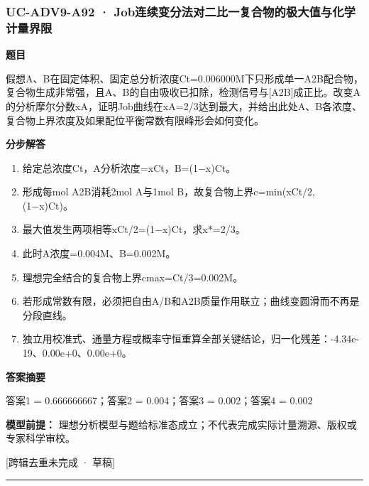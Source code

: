 \documentclass[UTF8,11pt,a4paper]{ctexart}
\begin{document}
\subsubsection*{UC-ADV9-A92 · Job连续变分法对二比一复合物的极大值与化学计量界限}
\noindent\textbf{题目}\par
假想A、B在固定体积、固定总分析浓度Ct=0.006000M下只形成单一A2B配合物，复合物生成非常强，且A、B的自由吸收已扣除，检测信号与[A2B]成正比。改变A的分析摩尔分数xA，证明Job曲线在xA=2/3达到最大，并给出此处A、B各浓度、复合物上界浓度及如果配位平衡常数有限峰形会如何变化。\par
\medskip\noindent\textbf{分步解答}
\begin{enumerate}
\item 给定总浓度Ct，A分析浓度=xCt，B=(1−x)Ct。
\item 形成每mol A2B消耗2mol A与1mol B，故复合物上界c=min(xCt/2,(1−x)Ct)。
\item 最大值发生两项相等xCt/2=(1−x)Ct，求x*=2/3。
\item 此时A浓度=0.004M、B=0.002M。
\item 理想完全结合的复合物上界cmax=Ct/3=0.002M。
\item 若形成常数有限，必须把自由A/B和A2B质量作用联立；曲线变圆滑而不再是分段直线。
\item 独立用校准式、通量方程或概率守恒重算全部关键结论，归一化残差：-4.34e-19、0.00e+0、0.00e+0。
\end{enumerate}
\noindent\textbf{答案摘要}\par
答案1 = 0.666666667；答案2 = 0.004；答案3 = 0.002；答案4 = 0.002\par
\noindent\textbf{模型前提：}
理想分析模型与题给标准态成立；不代表完成实际计量溯源、版权或专家科学审校。\par
\noindent\textcolor{red!65!black}{[跨辑去重未完成 · 草稿]} \par
\medskip\hrule\medskip
{}
\end{document}
